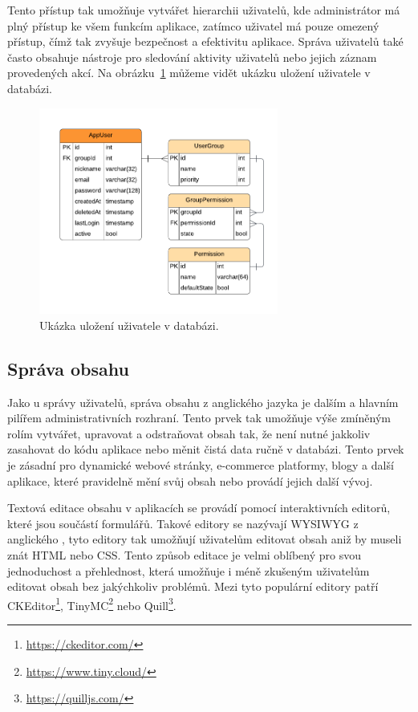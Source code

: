 Tento přístup tak umožňuje vytvářet hierarchii uživatelů, kde administrátor má plný přístup ke všem funkcím aplikace, zatímco uživatel má pouze omezený přístup, čímž tak zvyšuje bezpečnost a efektivitu aplikace. Správa uživatelů také často obsahuje nástroje pro sledování aktivity uživatelů nebo jejich záznam provedených akcí. Na obrázku~\ref{fig:user-management} můžeme vidět ukázku uložení uživatele v databázi.

\begin{figure}[H]
    \centering
    \includegraphics[width=0.7\textwidth]{diagrams/userManagement}
    \caption{Ukázka uložení uživatele v databázi. \cite{responsive_design}}
    \label{fig:user-management}
\end{figure}

\subsection{Správa obsahu}
\label{subsec:admin-elements-content-management}
Jako u správy uživatelů, správa obsahu z anglického jazyka \textit{} je dalším a hlavním pilířem administrativních rozhraní. Tento prvek tak umožňuje výše zmíněným rolím vytvářet, upravovat a odstraňovat obsah tak, že není nutné jakkoliv zasahovat do kódu aplikace nebo měnit čistá data ručně v databázi. Tento prvek je zásadní pro dynamické webové stránky, e-commerce platformy, blogy a další aplikace, které pravidelně mění svůj obsah nebo provádí jejich další vývoj.

Textová editace obsahu v aplikacích se provádí pomocí interaktivních editorů, které jsou součástí formulářů. Takové editory se nazývají WYSIWYG z anglického \textit{}, tyto editory tak umožňují uživatelům editovat obsah aniž by museli znát HTML nebo CSS. Tento způsob editace je velmi oblíbený pro svou jednoduchost a přehlednost, která umožňuje i méně zkušeným uživatelům editovat obsah bez jakýchkoliv problémů. Mezi tyto populární editory patří CKEditor\footnote[1]{\url{https://ckeditor.com/}}, TinyMC\footnote[2]{\url{https://www.tiny.cloud/}} nebo Quill\footnote[3]{\url{https://quilljs.com/}}.

